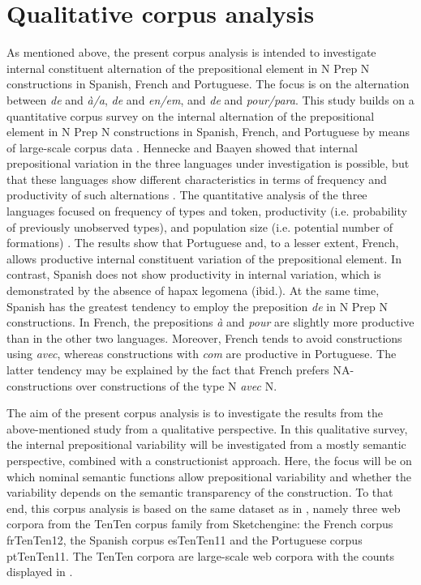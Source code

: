 \documentclass[output=paper]{langsci/langscibook}
\begin{document}
\section{Qualitative corpus analysis}
 As mentioned above, the present corpus analysis is intended to investigate internal constituent alternation of the prepositional element in N Prep N constructions in Spanish, French and Portuguese. The focus is on the alternation between \textit{de} and \textit{à/a}, \textit{de} and \textit{en/em}, and \textit{de} and \textit{pour/para}. This study builds on a quantitative corpus survey on the internal alternation of the prepositional element in N Prep N constructions in Spanish, French, and Portuguese by means of large-scale corpus data \citep{Hennecke:2017}. Hennecke and Baayen showed that internal prepositional variation in the three languages under investigation is possible, but that these languages show different characteristics in terms of frequency and productivity of such alternations \citep[144]{Hennecke:2017}. The quantitative analysis of the three languages focused on frequency of types and token, productivity (i.e. probability of previously unobserved types), and population size (i.e. potential number of formations) \citep[139]{Hennecke:2017}. The results show that Portuguese and, to a lesser extent, French, allows productive internal constituent variation of the prepositional element. In contrast, Spanish does not show productivity in internal variation, which is demonstrated by the absence of hapax legomena (ibid.). At the same time, Spanish has the greatest tendency to employ the preposition \textit{de} in N Prep N constructions. In French, the prepositions \textit{à} and \textit{pour} are slightly more productive than in the other two languages. Moreover, French tends to avoid constructions using \textit{avec}, whereas constructions with \textit{com} are productive in Portuguese. The latter tendency may be explained by the fact that French prefers NA-constructions over constructions of the type N \textit{avec} N.
 
The aim of the present corpus analysis is to investigate the results from the above-mentioned study from a qualitative perspective. In this qualitative survey, the internal prepositional variability will be investigated from a mostly semantic perspective, combined with a constructionist approach. Here, the focus will be on which nominal semantic functions allow prepositional variability and whether the variability depends on the semantic transparency of the construction. To that end, this corpus analysis is based on the same dataset as in \citet{Hennecke:2017}, namely three web corpora from the TenTen corpus family from Sketchengine: the French corpus frTenTen12, the Spanish corpus esTenTen11 and the Portuguese corpus ptTenTen11. The TenTen corpora are large-scale web corpora with the counts displayed in .
\end{document}
